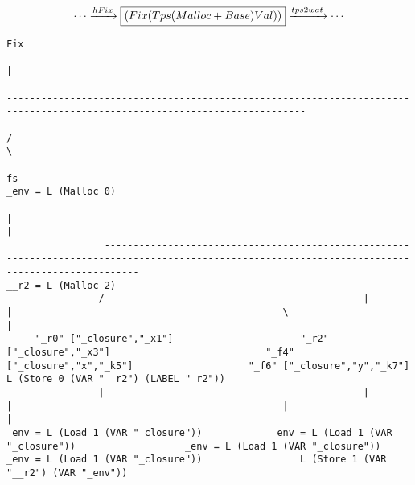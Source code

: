 \begin{landscape}
\begin{gather*}
  \cdots \xrightarrow{hFix} \boxed{(Fix (Tps (Malloc + Base) Val))} \xrightarrow{tps2wat} \cdots
\end{gather*}
\begin{lstlisting}[basicstyle=\fontsize{6}{7}\selectfont\ttfamily]
                                                                                                                         Fix
                                                                                                                          |
                                                                                              --------------------------------------------------------------------------------------------------------------------------
                                                                                             /                                                                                                                          \
                                                                                             fs                                                                                                                _env = L (Malloc 0)
                                                                                             |                                                                                                                          |
                 --------------------------------------------------------------------------------------------------------------------------------------------------                                            __r2 = L (Malloc 2)
                /                                             |                                                    |                                               \                                                    |
     "_r0" ["_closure","_x1"]                      "_r2" ["_closure","_x3"]                           "_f4" ["_closure","x","_k5"]                    "_f6" ["_closure","y","_k7"]                    L (Store 0 (VAR "__r2") (LABEL "_r2"))
                |                                             |                                                    |                                               |                                                    |
_env = L (Load 1 (VAR "_closure"))            _env = L (Load 1 (VAR "_closure"))                   _env = L (Load 1 (VAR "_closure"))              _env = L (Load 1 (VAR "_closure"))                 L (Store 1 (VAR "__r2") (VAR "_env"))

\end{lstlisting}
\end{landscape}
